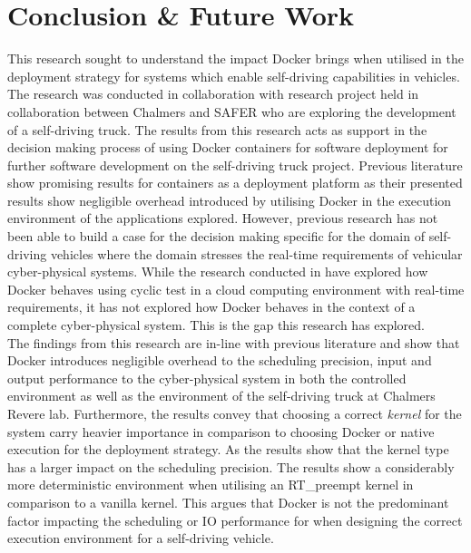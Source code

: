 \iffalse  \fi
\chapter{Conclusion \& Future Work} \label{section:conclusion}

This research sought to understand the impact Docker brings when utilised in the deployment strategy for systems which enable self-driving capabilities in vehicles. The research was conducted in collaboration with research project held in collaboration between Chalmers and SAFER who are exploring the development of a self-driving truck. The results from this research acts as support in the decision making process of using Docker containers for software deployment for further software development on the self-driving truck project. Previous literature \cite{p6,p10,p3,p4,p7,p9} show promising results for containers as a deployment platform as their presented results show negligible overhead introduced by utilising Docker in the execution environment of the applications explored. However, previous research has not been able to build a case for the decision making specific for the domain of self-driving vehicles where the domain stresses the real-time requirements of vehicular cyber-physical systems. While the research conducted in \cite{p1} have explored how Docker behaves using cyclic test in a cloud computing environment with real-time requirements, it has not explored how Docker behaves in the context of a complete cyber-physical system. This is the gap this research has explored.\\

The findings from this research are in-line with previous literature and show that Docker introduces negligible overhead to the scheduling precision, input and output performance to the cyber-physical system in both the controlled environment as well as the environment of the self-driving truck at Chalmers Revere lab. Furthermore, the results convey that choosing a correct \textit{kernel} for the system carry heavier importance in comparison to choosing Docker or native execution for the deployment strategy. As the results show that the kernel type has a larger impact on the scheduling precision. The results show a considerably more deterministic environment when utilising an RT\_preempt kernel in comparison to a vanilla kernel. This argues that Docker is not the predominant factor impacting the scheduling or IO performance for when designing the correct execution environment for a self-driving vehicle.\\

